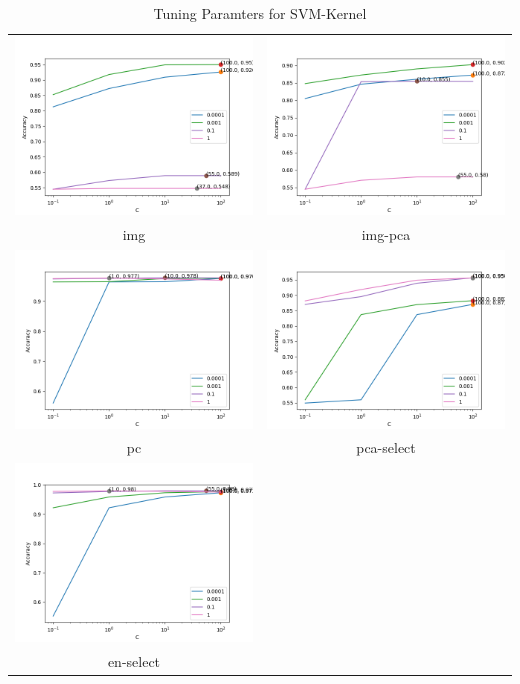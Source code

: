 \documentclass{article}
\begin{document}
\begin{table}[H] \label{KNN-tune}
    \centering
    \footnotesize
    \begin{tabular}{cc}
       \includegraphics[width = .45\textwidth]{images/svm-tune-img.png}  & \includegraphics[width = .45\textwidth]{images/svm-tune-img-pca.png}\\
      img  & img-pca  \\
        \includegraphics[width = .45\textwidth]{images/svm-tune-pc.png}  & \includegraphics[width = .45\textwidth]{images/svm-tune-pca-var.png}\\
       pc& pca-select\\
       \includegraphics[width = .45\textwidth]{images/svm-tune-en-k.png} \\
         en-select & \\
    \end{tabular}
    \caption{Tuning Paramters for SVM-Kernel}
    \label{svm-tune-chart}
\end{table}
\end{document}
